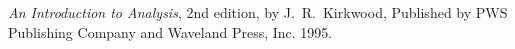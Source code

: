 \documentclass[12pt]{etsu_thesis}
\begin{document}


\clearpage {}
\vspace{.3in}


\begin{thebibliography}{99}

 {\it An Introduction to Analysis}, 2nd edition, by J.\ R.\ Kirkwood, Published by PWS Publishing Company and Waveland Press, Inc. 1995. 


\end{thebibliography}





\end{document}
